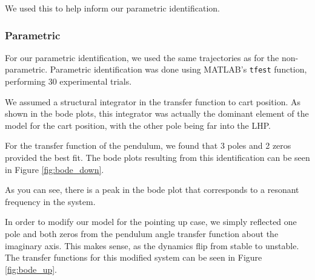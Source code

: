 \documentclass[12pt]{article}
\begin{document}
We used this to help inform our parametric identification.

\subsubsection{Parametric}

For our parametric identification, we used the same trajectories as for the non-parametric. 
Parametric identification was done using MATLAB's \texttt{tfest} function, performing 30 experimental trials.

We assumed a structural integrator in the transfer function to cart position. As shown in the bode plots, this integrator was actually the dominant element of the model for the cart position, with the other pole being far into the LHP.

For the transfer function of the pendulum, we found that 3 poles and 2 zeros provided the best fit. The bode plots resulting from this identification can be seen in Figure \ref{fig:bode_down}.

As you can see, there is a peak in the bode plot that corresponds to a resonant frequency in the system.

In order to modify our model for the pointing up case, we simply reflected one pole and both zeros from the pendulum angle transfer function about the imaginary axis. This makes sense, as the dynamics flip from stable to unstable. The transfer functions for this modified system can be seen in Figure \ref{fig:bode_up}.
\end{document}
